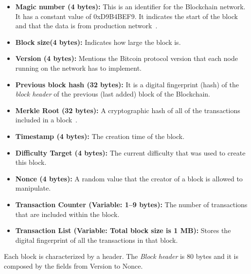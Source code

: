 \begin{itemize}
\item \textbf{Magic number (4 bytes):} This is an identifier for the Blockchain network. It has a constant value of 0xD9B4BEF9. It indicates the start of the block and that the data is from production network~\cite{medium}.

\item \textbf{Block size(4 bytes):} Indicates how large the block is.

\item \textbf{Version (4 bytes):} Mentions the Bitcoin protocol version that each node running on the network has to implement.

\item \textbf{Previous block hash (32 bytes):} It is a digital fingerprint (hash) of the \textit{block header} of the previous (last added) block of the Blockchain.

\item \textbf{Merkle Root (32 bytes):} A cryptographic hash of all of the transactions included in a block~\cite{architecture}.

\item \textbf{Timestamp (4 bytes):} The creation time of the block.

\item \textbf{Difficulty Target (4 bytes):} The current difficulty that was used to create this block.

\item \textbf{Nonce (4 bytes):} A random value that the creator of a block is allowed to manipulate.

\item \textbf{Transaction Counter (Variable: 1–9 bytes):} The number of transactions that are included within the block.

\item \textbf{Transaction List (Variable: Total block size is 1 MB):} Stores the digital fingerprint of all the transactions in that block.
\end{itemize}

Each block is characterized by a header. The \textit{Block header} is 80 bytes and it is composed by the fields from Version to Nonce.

